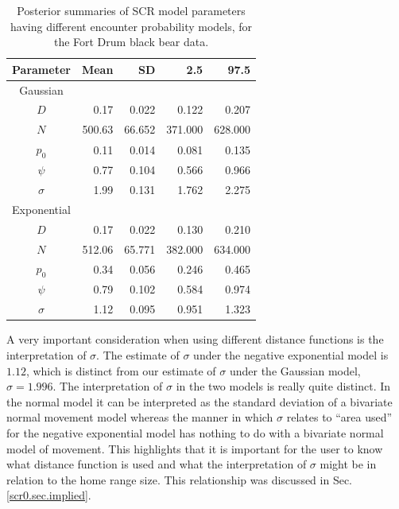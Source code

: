 \begin{table}[ht]
\centering
\caption{Posterior summaries of SCR model parameters having 
  different encounter probability models, for the Fort Drum black bear data.}
\begin{tabular}{crrrr}
\hline \hline
Parameter & Mean & SD & 2.5 & 97.5 \\
\hline

Gaussian  &   &      &           &        \\
\hline
$D$    &   0.17   & 0.022     &  0.122 & 0.207  \\
$N$    &  500.63 & 66.652  & 371.000   & 628.000       \\
$p_0$  &    0.11  & 0.014   & 0.081& 0.135     \\
$\psi$  &   0.77  & 0.104    & 0.566 & 0.966    \\
$\sigma$ &  1.99 & 0.131  &1.762 & 2.275     \\

Exponential &   &      &          &        \\
\hline
$D$  &   0.17 &  0.022 &	0.130		& 	0.210	 \\
$N$   &  512.06 &  65.771  &	382.000		& 	634.000	 \\
$p_0$  &    0.34 &   0.056  &	0.246	& 0.465		 \\
$\psi$  &   0.79  &  0.102  &	0.584		& 	0.974	 \\
$\sigma$ &  1.12  & 0.095  &	0.951		& 	1.323	 \\ \hline
\end{tabular}
\label{covariates.tab.SCR0exp}
\end{table}

A very important consideration when using different distance functions is the
interpretation of $\sigma$.  The estimate of $\sigma$ under the negative exponential model is
$1.12$, which is distinct from our
estimate of $\sigma$ under the Gaussian model, $\sigma = 1.996$.
The interpretation
of $\sigma$ in the two models is really quite distinct. In the normal
model it can be interpreted as the standard deviation of a bivariate
normal movement model whereas the manner in which $\sigma$ relates to
``area used'' for the negative exponential model has nothing to do
with a bivariate normal model of movement.  This highlights that it is
important for the user to know what distance function is used and what
the interpretation of $\sigma$ might be in relation to the home range size.
This relationship was discussed in Sec. \ref{scr0.sec.implied}.

